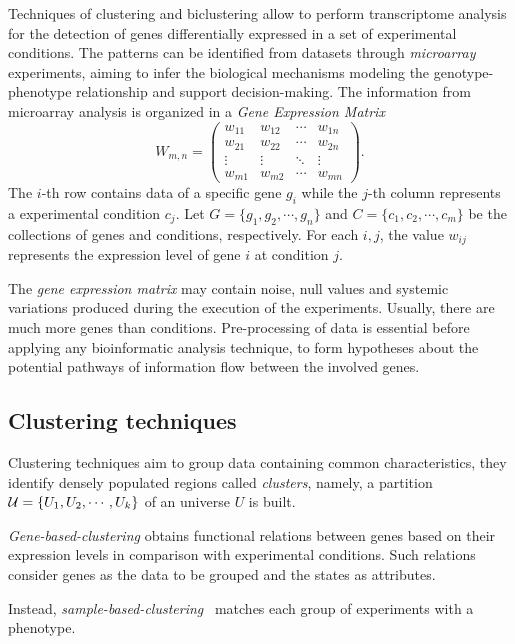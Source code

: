 \documentclass[a4paper,conference]{IEEEtran}
\begin{document}
Techniques of clustering and biclustering allow to perform transcriptome analysis for the detection of genes differentially expressed in a set of experimental conditions. The patterns can be identified from datasets through \textit{microarray} experiments, aiming to infer the biological mechanisms modeling the genotype-phenotype relationship and support decision-making. The information from microarray analysis is organized in a  \textit{Gene Expression Matrix} 
\begin{equation}
W_{m,n} =
 \begin{pmatrix}
  w_{11} & w_{12} & \cdots & w_{1n} \\
  w_{21} & w_{22} & \cdots & w_{2n} \\
  \vdots  & \vdots  & \ddots & \vdots  \\
  w_{m1} & w_{m2} & \cdots & w_{mn}
 \end{pmatrix}.
 \label{eq.gem}
\end{equation}
The $i$-th row contains data of a specific gene $g_i$ while the $j$-th column represents a experimental condition $c_j$. Let $G=\{g_1, g_2, \cdots, g_n\}$ and $C=\{c_1, c_2, \cdots, c_m\}$ be the collections of genes and conditions, respectively. For each $i,j$, the value $w_{ij}$ represents the expression level of gene $i$ at condition $j$.

The \textit{gene expression matrix} may contain noise, null values and systemic variations produced during the execution of the experiments. Usually, there are much more genes than conditions. Pre-processing of data is essential before applying any bioinformatic analysis technique, to form hypotheses about the potential pathways of information flow between the involved genes.

\subsection{Clustering techniques}

Clustering techniques aim to group data containing common characteristics, they identify densely populated regions called \textit{clusters}, namely, a partition ${\cal U} = \{U_1, U_2, \cdots, U_k \} $ of an universe $U$ is built.

\textit{Gene-based-clustering} obtains functional relations between genes based on their expression levels in comparison with experimental conditions. Such relations consider genes as the data to be grouped and the states as attributes. 

Instead, \textit{sample-based-clustering}~\cite{golub1999molecular} matches each group of experiments with a phenotype.
\end{document}
